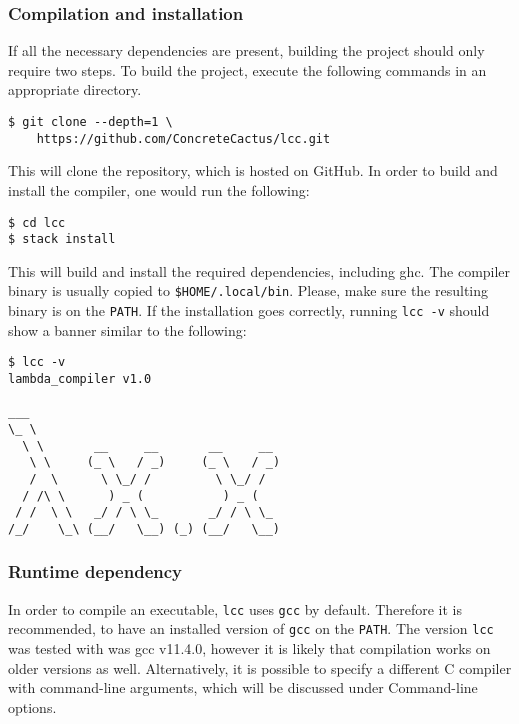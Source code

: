 \documentclass[12pt]{article}
\begin{document}
\subsubsection{Compilation and installation}

If all the necessary dependencies are present, building the project should only
require two steps. To build the project, execute the following commands in an
appropriate directory.
\begin{lstlisting}
$ git clone --depth=1 \
    https://github.com/ConcreteCactus/lcc.git
\end{lstlisting}
This will clone the repository, which is hosted on GitHub. In order to build and
install the compiler, one would run the following:
\begin{lstlisting}
$ cd lcc
$ stack install
\end{lstlisting}
This will build and install the required dependencies, including ghc. The
compiler binary is usually copied to \texttt{\$HOME/.local/bin}. Please, make
sure the resulting binary is on the \texttt{PATH}. If the installation goes
correctly, running \texttt{lcc -v} should show a banner similar to the
following:

\vspace{1em}\noindent\begin{minipage}{\textwidth}
\begin{lstlisting}
$ lcc -v
lambda_compiler v1.0

___
\_ \
  \ \       __     __       __     __
   \ \     (_ \   / _)     (_ \   / _)
   /  \      \ \_/ /         \ \_/ /
  / /\ \      ) _ (           ) _ (
 / /  \ \   _/ / \ \_       _/ / \ \_
/_/    \_\ (__/   \__) (_) (__/   \__)
\end{lstlisting}
\end{minipage}

\subsubsection{Runtime dependency}

In order to compile an executable, \texttt{lcc} uses \texttt{gcc} by default.
Therefore it is recommended, to have an installed version of \texttt{gcc} on the
\texttt{PATH}. The version \texttt{lcc} was tested with was gcc v11.4.0, however
it is likely that compilation works on older versions as well. Alternatively, it
is possible to specify a different C compiler with command-line arguments, which
will be discussed under Command-line options.
\end{document}
